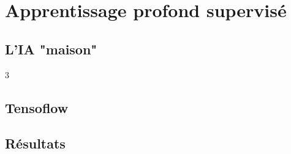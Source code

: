 \section{Apprentissage profond supervisé}

\subsection{L'IA "maison"}
	
	\begin{frame}3
		
	\end{frame}

\subsection{Tensoflow}
	
	\begin{frame}
		
	\end{frame}

\subsection{Résultats}
	
	\begin{frame}
		
	\end{frame}